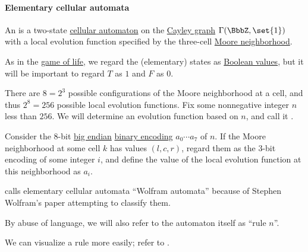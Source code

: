 \paragraph{Elementary cellular automata}

\begin{definition}\label{def:elementary_cellular_automaton}
  An  is a two-state \hyperref[def:cellular_automaton]{cellular automaton} on the \hyperref[def:cayley_graph]{Cayley graph} \( \Gamma(\BbbZ, \set{ 1 }) \) with a local evolution function specified by the three-cell \hyperref[def:cayley_graph_neighborhood/moore]{Moore neighborhood}.

  As in the \hyperref[def:game_of_life]{game of life}, we regard the (elementary) states as \hyperref[con:boolean_value]{Boolean values}, but it will be important to regard \( T \) as \( 1 \) and \( F \) as \( 0 \).

  There are \( 8 = 2^3 \) possible configurations of the Moore neighborhood at a cell, and thus \( 2^8 = 256 \) possible local evolution functions. Fix some nonnegative integer \( n \) less than \( 256 \). We will determine an evolution function based on \( n \), and call it .

  Consider the \( 8 \)-bit \hyperref[def:endianness/big]{big endian} \hyperref[def:fixed_length_nonnegative_integer_encoding]{binary encoding} \( a_0 \cdots a_7 \) of \( n \). If the Moore neighborhood at some cell \( k \) has values \( (l, c, r) \), regard them as the \( 3 \)-bit encoding of some integer \( i \), and define the value of the local evolution function at this neighborhood as \( a_i \).
\end{definition}
\begin{comments}
  \item {} calls elementary cellular automata \enquote{Wolfram automata} because of Stephen Wolfram's paper \cite{Wolfram1983StatisticalMechanicsOfCellularAutomata} attempting to classify them.

  \item By abuse of language, we will also refer to the automaton itself as \enquote{rule \( n \)}.

  \item We can visualize a rule more easily; refer to .
\end{comments}

